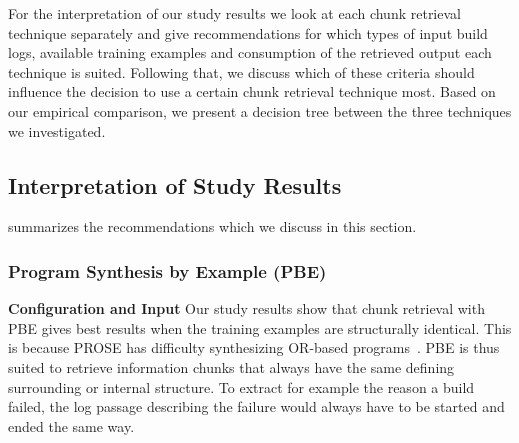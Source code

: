For the interpretation of our study results we look at each chunk
retrieval technique separately and give recommendations for
which types of input build
logs, available training examples and consumption of the retrieved
output each technique is suited.
Following that, we discuss
which of these criteria should influence the decision to use a certain
chunk retrieval technique most.
Based on our empirical comparison, we present a
decision tree between the three techniques we investigated.

\subsection{Interpretation of Study Results}
 summarizes the
recommendations which we discuss
in this section.

\begin{table}[tbp]
\caption{Recommendations for each of the investigated chunk retrieval
techniques.}
\label{tab:single-technique-recommendations}
\end{table}

\subsubsection{Program Synthesis by Example (PBE)}

\noindent
\textbf{Configuration and Input}
Our study results show that chunk retrieval with PBE gives best
results when the training examples are structurally identical.
This is
because PROSE has difficulty synthesizing OR-based
programs~\cite{mayer2015user}.
PBE is thus suited to retrieve information
chunks that always have the same defining surrounding or internal
structure.
To extract for example the reason a build failed, the log
passage describing the failure would always have to be started and
ended the same way.

